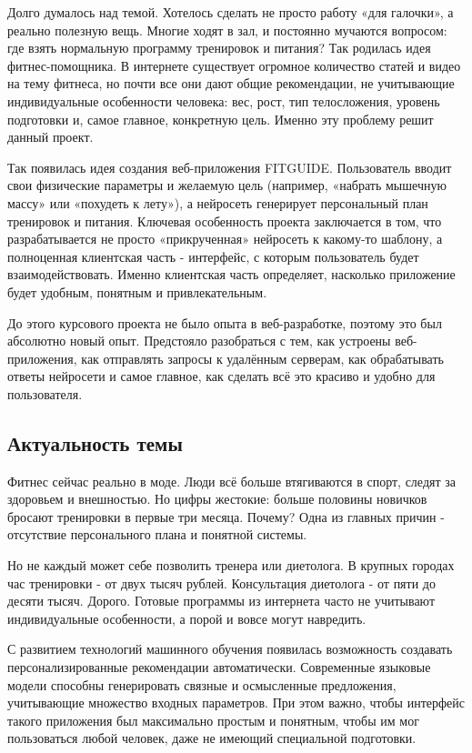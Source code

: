 \documentclass[14pt, a4paper]{extarticle}
\begin{document}
\medskip
\noindent Долго думалось над темой. Хотелось сделать не просто работу «для галочки», а реально полезную вещь. Многие ходят в зал, и постоянно мучаются вопросом: где взять нормальную программу тренировок и питания? Так родилась идея фитнес-помощника. В интернете существует огромное количество статей и видео на тему фитнеса, но почти все они дают общие рекомендации, не учитывающие индивидуальные особенности человека: вес, рост, тип телосложения, уровень подготовки и, самое главное, конкретную цель. Именно эту проблему решит данный проект.

\medskip
\noindent Так появилась идея создания веб-приложения FITGUIDE. Пользователь вводит свои физические параметры и желаемую цель (например, «набрать мышечную массу» или «похудеть к лету»), а нейросеть генерирует персональный план тренировок и питания. Ключевая особенность проекта заключается в том, что разрабатывается не просто «прикрученная» нейросеть к какому-то шаблону, а полноценная клиентская часть - интерфейс, с которым пользователь будет взаимодействовать. Именно клиентская часть определяет, насколько приложение будет удобным, понятным и привлекательным.

\medskip
\noindent До этого курсового проекта не было опыта в веб-разработке, поэтому это был абсолютно новый опыт. Предстояло разобраться с тем, как устроены веб-приложения, как отправлять запросы к удалённым серверам, как обрабатывать ответы нейросети и самое главное, как сделать всё это красиво и удобно для пользователя.

\subsection*{Актуальность темы}

\noindent Фитнес сейчас реально в моде. Люди всё больше втягиваются в спорт, следят за здоровьем и внешностью. Но цифры жестокие: больше половины новичков бросают тренировки в первые три месяца. Почему? Одна из главных причин - отсутствие персонального плана и понятной системы.

\medskip
\noindent Но не каждый может себе позволить тренера или диетолога. В крупных городах час тренировки - от двух тысяч рублей. Консультация диетолога - от пяти до десяти тысяч. Дорого. Готовые программы из интернета часто не учитывают индивидуальные особенности, а порой и вовсе могут навредить.

\medskip
\noindent С развитием технологий машинного обучения появилась возможность создавать персонализированные рекомендации автоматически. Современные языковые модели способны генерировать связные и осмысленные предложения, учитывающие множество входных параметров. При этом важно, чтобы интерфейс такого приложения был максимально простым и понятным, чтобы им мог пользоваться любой человек, даже не имеющий специальной подготовки.
\end{document}

